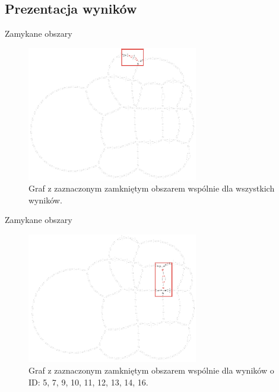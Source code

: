 \documentclass{beamer}
\begin{document}
\subsection{Prezentacja wyników}
\begin{frame}{Zamykane obszary} 
\begin{figure}[b]
\includegraphics[width=0.666\textwidth]{img/wspolne3}
\caption{Graf z zaznaczonym zamkniętym obszarem wspólnie dla wszystkich wyników.}
\end{figure}
\end{frame}

\begin{frame}{Zamykane obszary} 
\begin{figure}[b]
\includegraphics[width=0.666\textwidth]{img/wspolne1}
\caption{Graf z zaznaczonym zamkniętym obszarem wspólnie dla wyników o ID: 5, 7, 9, 10, 11, 12, 13, 14, 16.}
\end{figure}
\end{frame}
\end{document}
